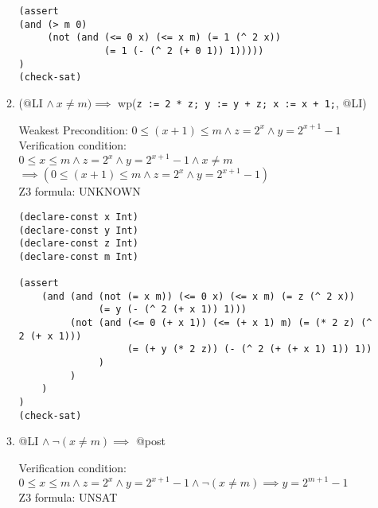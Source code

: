 \documentclass{article}
\begin{document}
\begin{enumerate}
\begin{enumerate}[(1)]
\begin{verbatim}
(assert 
(and (> m 0) 
     (not (and (<= 0 x) (<= x m) (= 1 (^ 2 x))
               (= 1 (- (^ 2 (+ 0 1)) 1)))))
)
(check-sat)
\end{verbatim}

\item (@LI $\land\ x \neq m) \implies$ wp(\verb|z := 2 * z; y := y + z; x := x + 1;|, @LI)

        Weakest Precondition: $0 \leq (x + 1) \leq m \land z = 2^x \land y = 2^{x + 1} - 1$ \\
        Verification condition:\\
        $0 \leq x \leq m \land z = 2^x \land y = 2^{x + 1} - 1 \land x \neq m$ \\
        $\implies (0 \leq (x + 1) \leq m \land z = 2^x \land y = 2^{x + 1} - 1)$ \\
        Z3 formula: UNKNOWN
\begin{verbatim}
(declare-const x Int)
(declare-const y Int)
(declare-const z Int)
(declare-const m Int)

(assert 
    (and (and (not (= x m)) (<= 0 x) (<= x m) (= z (^ 2 x))
              (= y (- (^ 2 (+ x 1)) 1)))
         (not (and (<= 0 (+ x 1)) (<= (+ x 1) m) (= (* 2 z) (^ 2 (+ x 1)))
                   (= (+ y (* 2 z)) (- (^ 2 (+ (+ x 1) 1)) 1))
              )
         )
    )
)
(check-sat)
\end{verbatim}

\item @LI $\land\ \neg(x\neq m) \implies$ @post

        Verification condition:\\
        $0 \leq x \leq m \land z = 2^x \land y = 2^{x + 1} - 1 \land \neg(x \neq m) \implies y = 2^{m+1} - 1$\\
        Z3 formula: UNSAT
        
\end{enumerate}

\end{enumerate}
\end{document}
